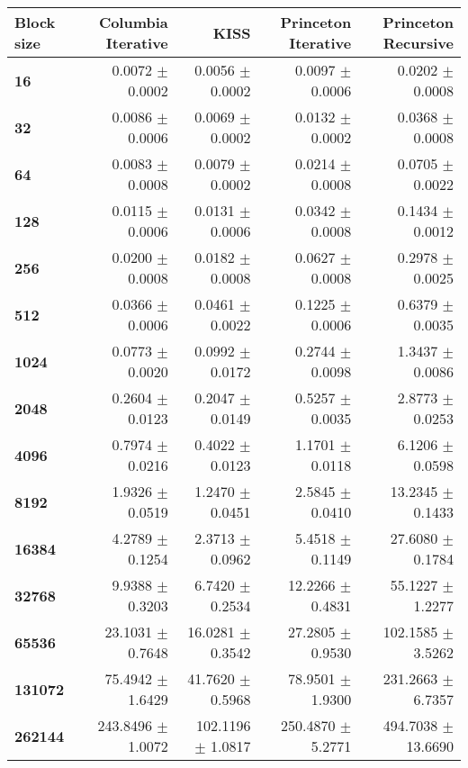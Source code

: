 \begin{tabular}{lrrrr}\toprule
\textbf{Block size}  & \textbf{Columbia Iterative} & \textbf{KISS} & \textbf{Princeton Iterative} & \textbf{Princeton Recursive}\\\midrule
\textbf{16}  & 0.0072 $\pm$ 0.0002 & 0.0056 $\pm$ 0.0002 & 0.0097 $\pm$ 0.0006 & 0.0202 $\pm$ 0.0008\\
\textbf{32}  & 0.0086 $\pm$ 0.0006 & 0.0069 $\pm$ 0.0002 & 0.0132 $\pm$ 0.0002 & 0.0368 $\pm$ 0.0008\\
\textbf{64}  & 0.0083 $\pm$ 0.0008 & 0.0079 $\pm$ 0.0002 & 0.0214 $\pm$ 0.0008 & 0.0705 $\pm$ 0.0022\\
\textbf{128}  & 0.0115 $\pm$ 0.0006 & 0.0131 $\pm$ 0.0006 & 0.0342 $\pm$ 0.0008 & 0.1434 $\pm$ 0.0012\\
\textbf{256}  & 0.0200 $\pm$ 0.0008 & 0.0182 $\pm$ 0.0008 & 0.0627 $\pm$ 0.0008 & 0.2978 $\pm$ 0.0025\\
\textbf{512}  & 0.0366 $\pm$ 0.0006 & 0.0461 $\pm$ 0.0022 & 0.1225 $\pm$ 0.0006 & 0.6379 $\pm$ 0.0035\\
\textbf{1024}  & 0.0773 $\pm$ 0.0020 & 0.0992 $\pm$ 0.0172 & 0.2744 $\pm$ 0.0098 & 1.3437 $\pm$ 0.0086\\
\textbf{2048}  & 0.2604 $\pm$ 0.0123 & 0.2047 $\pm$ 0.0149 & 0.5257 $\pm$ 0.0035 & 2.8773 $\pm$ 0.0253\\
\textbf{4096}  & 0.7974 $\pm$ 0.0216 & 0.4022 $\pm$ 0.0123 & 1.1701 $\pm$ 0.0118 & 6.1206 $\pm$ 0.0598\\
\textbf{8192}  & 1.9326 $\pm$ 0.0519 & 1.2470 $\pm$ 0.0451 & 2.5845 $\pm$ 0.0410 & 13.2345 $\pm$ 0.1433\\
\textbf{16384}  & 4.2789 $\pm$ 0.1254 & 2.3713 $\pm$ 0.0962 & 5.4518 $\pm$ 0.1149 & 27.6080 $\pm$ 0.1784\\
\textbf{32768}  & 9.9388 $\pm$ 0.3203 & 6.7420 $\pm$ 0.2534 & 12.2266 $\pm$ 0.4831 & 55.1227 $\pm$ 1.2277\\
\textbf{65536}  & 23.1031 $\pm$ 0.7648 & 16.0281 $\pm$ 0.3542 & 27.2805 $\pm$ 0.9530 & 102.1585 $\pm$ 3.5262\\
\textbf{131072}  & 75.4942 $\pm$ 1.6429 & 41.7620 $\pm$ 0.5968 & 78.9501 $\pm$ 1.9300 & 231.2663 $\pm$ 6.7357\\
\textbf{262144} & 243.8496 $\pm$ 1.0072 & 102.1196 $\pm$ 1.0817 & 250.4870 $\pm$ 5.2771 & 494.7038 $\pm$ 13.6690\\
\bottomrule
\end{tabular}
